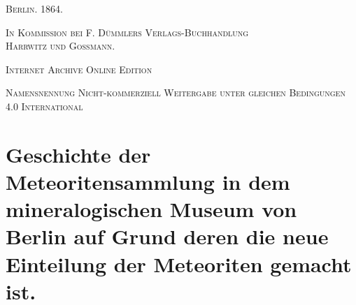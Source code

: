 \documentclass[a4paper, 11pt, oneside]{article}
\begin{document}
\begin{titlepage}
	\vspace{1\baselineskip}

	{\small\scshape Berlin. 1864.}
	
	{\small\scshape{In Kommission bei F. Dümmlers Verlags-Buchhandlung\\Harrwitz und Gossmann.}}
	
	\vspace{0.5\baselineskip} %

    \scshape Internet Archive Online Edition  %
	
	{\scshape\small Namensnennung Nicht-kommerziell Weitergabe unter gleichen Bedingungen 4.0 International} %
\end{titlepage}
\setlength{\parskip}{1mm plus1mm minus1mm}
\clearpage
\tableofcontents
\clearpage
\section{Geschichte der Meteoritensammlung in dem mineralogischen Museum von Berlin auf Grund deren die neue Einteilung der Meteoriten gemacht ist.}
\end{document}
